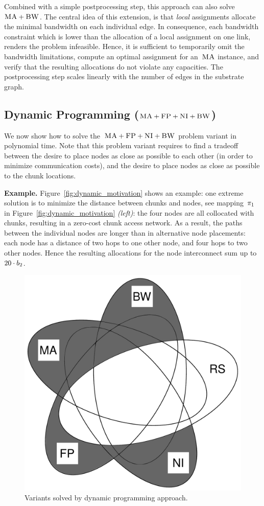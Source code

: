 Combined with a simple postprocessing step, this approach can also solve~$\textsc{MA}+\textsc{BW}$. The central idea of this extension, is
that \emph{local} assignments allocate the minimal bandwidth
on each individual edge. In consequence, each bandwidth constraint
which is lower than the allocation of a local assignment on one link, renders
the problem infeasible. Hence, it is sufficient to temporarily omit the
bandwidth limitations, compute an optimal assignment for an~$\textsc{MA}$ instance, and
verify that the resulting allocations do not violate any capacities. The
postprocessing step scales linearly with the number of edges in the substrate
graph.


\subsection{Dynamic Programming ($\textsc{MA}+\textsc{FP}+\textsc{NI}+\textsc{BW}$)}\label{ssec:dyn}

We now show how to solve the~$\textsc{MA}+\textsc{FP}+\textsc{NI}+\textsc{BW}$ problem variant
in polynomial time.
Note that this problem variant requires to find a
tradeoff between the desire to place nodes as close as possible to each other
(in order to minimize communication costs), and the desire to place nodes
as close as possible to
the chunk locations.




\textbf{Example.} Figure~\ref{fig:dynamic_motivation} shows an example: one
extreme solution is to minimize the distance between chunks and nodes,
see mapping~$\pi_1$ in
Figure~\ref{fig:dynamic_motivation} \emph{(left)}: the four nodes are all
collocated with chunks, resulting in a zero-cost chunk access network. As a
result, the paths between the individual nodes are longer than in alternative
node placements: each node has a distance of two hops to one other node,
and four hops to two other nodes. Hence the resulting allocations for the
node interconnect sum up to~$20 \cdot b_2$.

\begin{figure}[t]
\centering
\includegraphics[width=0.49\columnwidth]{figs/static-mapping/venn_dp.pdf}
\caption{Variants solved by dynamic programming approach.}
\vspace{-1em}
\label{fig:venn_flow}
\end{figure}

